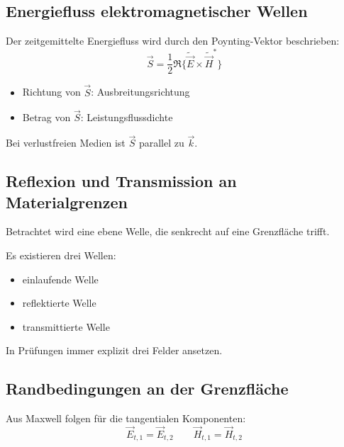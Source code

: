 \documentclass[a4paper]{article}
\newcommand{\E}{\vec E}
\newcommand{\Hf}{\vec H}
\begin{document}
\subsection{Energiefluss elektromagnetischer Wellen}

Der zeitgemittelte Energiefluss wird durch den Poynting-Vektor beschrieben:
\[
\vec S = \frac{1}{2}\Re\{\tilde{\E} \times \tilde{\Hf}^*\}
\]

\begin{itemize}
  \item Richtung von $\vec S$: Ausbreitungsrichtung
  \item Betrag von $\vec S$: Leistungsflussdichte
\end{itemize}

\begin{checkitem}
Bei verlustfreien Medien ist $\vec S$ parallel zu $\vec k$.
\end{checkitem}

\subsection{Reflexion und Transmission an Materialgrenzen}

Betrachtet wird eine ebene Welle, die senkrecht auf eine Grenzfläche trifft.

Es existieren drei Wellen:
\begin{itemize}
  \item einlaufende Welle
  \item reflektierte Welle
  \item transmittierte Welle
\end{itemize}

\begin{schema}
In Prüfungen immer explizit drei Felder ansetzen.
\end{schema}

\subsection{Randbedingungen an der Grenzfläche}

Aus Maxwell folgen für die tangentialen Komponenten:
\[
\E_{t,1} = \E_{t,2}
\qquad
\Hf_{t,1} = \Hf_{t,2}
\]
\end{document}
